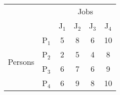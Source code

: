 \begin{tabular}{|c|c|c|c|c|c|}
    \hline
    \multicolumn{2}{|c|}{} & \multicolumn{4}{|c|}{Jobs} \\ \cline{3-6}
    \multicolumn{2}{|c|}{} & J$_1$ & J$_2$ & J$_3$ & J$_4$ \\ \hline
    \multirow{4}{*}{Persons} & P$_1$ & 5 & 8 & 6 & 10 \\ \cline{2-6}
     &P$_2$ & 2 & 5 & 4 & 8 \\ \cline{2-6}
     &P$_3$ & 6 & 7 & 6 & 9 \\ \cline{2-6}
     &P$_4$ & 6 & 9 & 8 & 10 \\ \hline
    \end{tabular}

